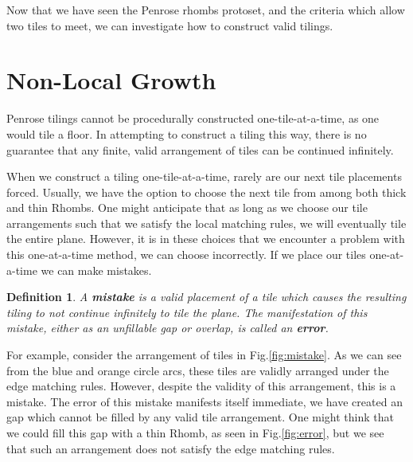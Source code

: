 \documentclass[
  oneside,
  11pt, a4paper,
  footinclude=true,
  headinclude=true,
  cleardoublepage=empty
]{scrbook}
\newtheorem{mydef}{Definition}
\begin{document}
Now that we have seen the Penrose rhombs protoset, and the criteria which allow two tiles to meet, we can investigate how to construct valid tilings. 


\section{Non-Local Growth} %
Penrose tilings cannot be procedurally constructed one-tile-at-a-time, as one would tile a floor. In attempting to construct a tiling this way, there is no guarantee that any finite, valid arrangement of tiles can be continued infinitely. 

When we construct a tiling one-tile-at-a-time, rarely are our next tile placements forced. Usually, we have the option to choose the next tile from among both thick and thin Rhombs. One might anticipate that as long as we choose our tile arrangements such that we satisfy the local matching rules, we will eventually tile the entire plane. However, it is in these choices that we encounter a problem with this one-at-a-time method, we can choose incorrectly. If we place our tiles one-at-a-time we can make mistakes.

\begin{mydef}
A \textbf{mistake} is a valid placement of a tile which causes the resulting tiling to not continue infinitely to tile the plane. The manifestation of this mistake, either as an unfillable gap or overlap, is called an \textbf{error}. \cite{Penrose1989,Ross}
\end{mydef}

For example, consider the arrangement of tiles in Fig.\ref{fig:mistake}. As we can see from the blue and orange circle arcs, these tiles are validly arranged under the edge matching rules. However, despite the validity of this arrangement, this is a mistake. The error of this mistake manifests itself immediate, we have created an gap which cannot be filled by any valid tile arrangement. One might think that we could fill this gap with a thin Rhomb, as seen in Fig.\ref{fig:error}, but we see that such an arrangement does not satisfy the edge matching rules.
\end{document}
